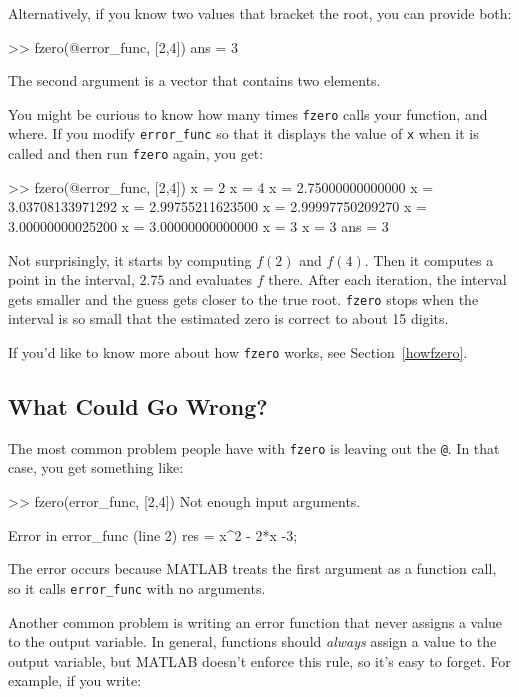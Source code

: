 Alternatively, if you know two values that bracket the root,
you can provide both:

\begin{code}
>> fzero(@error_func, [2,4])
ans = 3
\end{code}

The second argument is a vector that contains two elements.  


You might be curious to know how many times {\tt fzero} calls your
function, and where.  If you modify \verb"error_func" so that it displays
the value of {\tt x} when it is called and then run {\tt fzero}
again, you get:

\begin{code}
>> fzero(@error_func, [2,4])
x = 2
x = 4
x = 2.75000000000000
x = 3.03708133971292
x = 2.99755211623500
x = 2.99997750209270
x = 3.00000000025200
x = 3.00000000000000
x = 3
x = 3
ans = 3
\end{code}

Not surprisingly, it starts by computing $f(2)$ and $f(4)$.  Then it computes a point in the interval, $2.75$ and evaluates $f$ there.  After each iteration, the interval gets smaller and the guess gets closer to the true root.
{\tt fzero} stops when the interval is so small that the estimated
zero is correct to about 15 digits.
 
If you'd like to know more about how {\tt fzero} works, see Section~\ref{howfzero}.


\subsection{What Could Go Wrong?}

The most common problem people have with {\tt fzero} is leaving
out the {\tt @}.  In that case, you get something like:

\begin{code}
>> fzero(error_func, [2,4])
Not enough input arguments.

Error in error_func (line 2)
    res = x^2 - 2*x -3;
\end{code}

The error occurs because MATLAB treats the first argument as a function call, so it calls \verb"error_func" with no arguments.


Another common problem is writing an error function that never
assigns a value to the output variable.  In general, functions should
{\em always} assign a value to the output variable, but MATLAB doesn't
enforce this rule, so it's easy to forget.  For example, if you
write:


